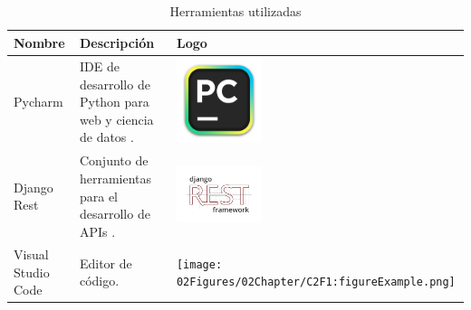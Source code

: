 \begin{table}[H]
    \centering
    \begin{tabular}{|m{2.5cm}|m{6cm}|m{3cm}|}
        \hline
        \textbf{Nombre} &  \textbf{Descripción} & \textbf{Logo} \\
        \hline
        Pycharm &  IDE de desarrollo de Python para web y ciencia de datos \cite{PycharmIDE}. & \includegraphics[width=2.5cm, height=2.5cm,keepaspectratio]{02Figures/02Chapter/pycharm-logo.png} \\
        \hline
        Django Rest &  Conjunto de herramientas para el desarrollo de APIs  \cite{DRFweb}. & \includegraphics[width=2.5cm, height=2.5cm,keepaspectratio]{02Figures/02Chapter/drf-logo.png} \\
        \hline
        Visual Studio Code & Editor de código.  & \texttt{[image: 02Figures/02Chapter/C2F1:figureExample.png]} \\
        \hline
        
    \end{tabular}
    \caption{Herramientas utilizadas}
    \label{tab:Tabla de herramientas utilizadas}
\end{table}
